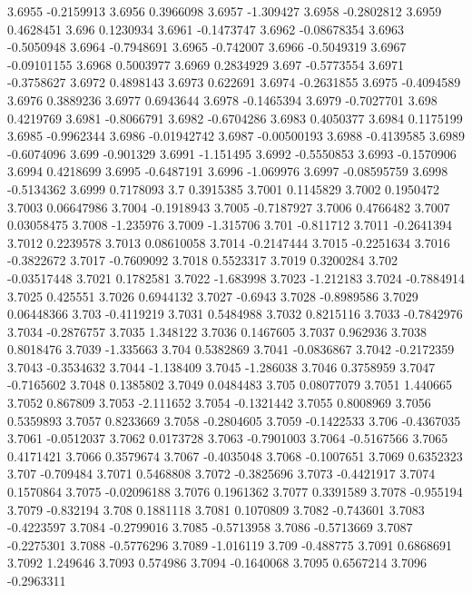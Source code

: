 3.6955  -0.2159913
3.6956  0.3966098
3.6957  -1.309427
3.6958  -0.2802812
3.6959  0.4628451
3.696  0.1230934
3.6961  -0.1473747
3.6962  -0.08678354
3.6963  -0.5050948
3.6964  -0.7948691
3.6965  -0.742007
3.6966  -0.5049319
3.6967  -0.09101155
3.6968  0.5003977
3.6969  0.2834929
3.697  -0.5773554
3.6971  -0.3758627
3.6972  0.4898143
3.6973  0.622691
3.6974  -0.2631855
3.6975  -0.4094589
3.6976  0.3889236
3.6977  0.6943644
3.6978  -0.1465394
3.6979  -0.7027701
3.698  0.4219769
3.6981  -0.8066791
3.6982  -0.6704286
3.6983  0.4050377
3.6984  0.1175199
3.6985  -0.9962344
3.6986  -0.01942742
3.6987  -0.00500193
3.6988  -0.4139585
3.6989  -0.6074096
3.699  -0.901329
3.6991  -1.151495
3.6992  -0.5550853
3.6993  -0.1570906
3.6994  0.4218699
3.6995  -0.6487191
3.6996  -1.069976
3.6997  -0.08595759
3.6998  -0.5134362
3.6999  0.7178093
3.7  0.3915385
3.7001  0.1145829
3.7002  0.1950472
3.7003  0.06647986
3.7004  -0.1918943
3.7005  -0.7187927
3.7006  0.4766482
3.7007  0.03058475
3.7008  -1.235976
3.7009  -1.315706
3.701  -0.811712
3.7011  -0.2641394
3.7012  0.2239578
3.7013  0.08610058
3.7014  -0.2147444
3.7015  -0.2251634
3.7016  -0.3822672
3.7017  -0.7609092
3.7018  0.5523317
3.7019  0.3200284
3.702  -0.03517448
3.7021  0.1782581
3.7022  -1.683998
3.7023  -1.212183
3.7024  -0.7884914
3.7025  0.425551
3.7026  0.6944132
3.7027  -0.6943
3.7028  -0.8989586
3.7029  0.06448366
3.703  -0.4119219
3.7031  0.5484988
3.7032  0.8215116
3.7033  -0.7842976
3.7034  -0.2876757
3.7035  1.348122
3.7036  0.1467605
3.7037  0.962936
3.7038  0.8018476
3.7039  -1.335663
3.704  0.5382869
3.7041  -0.0836867
3.7042  -0.2172359
3.7043  -0.3534632
3.7044  -1.138409
3.7045  -1.286038
3.7046  0.3758959
3.7047  -0.7165602
3.7048  0.1385802
3.7049  0.0484483
3.705  0.08077079
3.7051  1.440665
3.7052  0.867809
3.7053  -2.111652
3.7054  -0.1321442
3.7055  0.8008969
3.7056  0.5359893
3.7057  0.8233669
3.7058  -0.2804605
3.7059  -0.1422533
3.706  -0.4367035
3.7061  -0.0512037
3.7062  0.0173728
3.7063  -0.7901003
3.7064  -0.5167566
3.7065  0.4171421
3.7066  0.3579674
3.7067  -0.4035048
3.7068  -0.1007651
3.7069  0.6352323
3.707  -0.709484
3.7071  0.5468808
3.7072  -0.3825696
3.7073  -0.4421917
3.7074  0.1570864
3.7075  -0.02096188
3.7076  0.1961362
3.7077  0.3391589
3.7078  -0.955194
3.7079  -0.832194
3.708  0.1881118
3.7081  0.1070809
3.7082  -0.743601
3.7083  -0.4223597
3.7084  -0.2799016
3.7085  -0.5713958
3.7086  -0.5713669
3.7087  -0.2275301
3.7088  -0.5776296
3.7089  -1.016119
3.709  -0.488775
3.7091  0.6868691
3.7092  1.249646
3.7093  0.574986
3.7094  -0.1640068
3.7095  0.6567214
3.7096  -0.2963311
